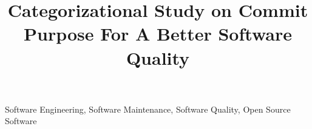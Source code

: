 \documentclass[10pt,conference]{IEEEtran}
\begin{document}
\title{Categorizational Study on Commit Purpose For A Better Software Quality}

\author{
}

\maketitle

\begin{abstract}

\end{abstract}

\begin{IEEEkeywords}
Software Engineering, Software Maintenance, Software Quality, Open Source Software
\end{IEEEkeywords}











\medskip



\vspace{12pt}
\color{red}
\end{document}
